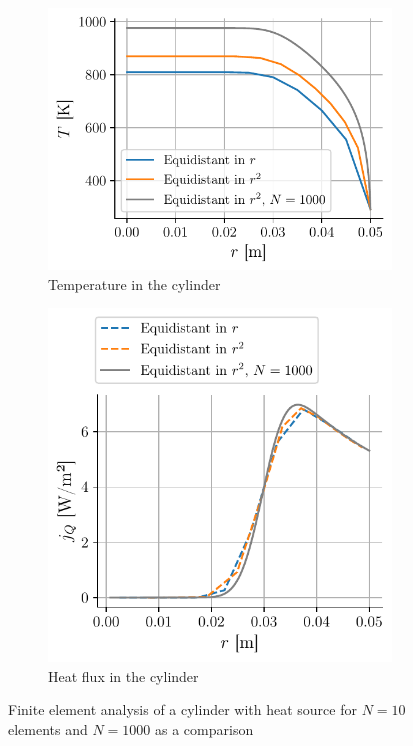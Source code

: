 \begin{figure}[h]
    \centering
    \begin{subfigure}{0.48\linewidth}
        \centering
        \includegraphics[width=\linewidth]{figures/var_T.pdf}
        \caption{Temperature in the cylinder}
        \label{fig:var_T}
    \end{subfigure}
    \begin{subfigure}{0.48\linewidth}
        \centering
        \includegraphics[width=\linewidth]{figures/var_j.pdf}
        \caption{Heat flux in the cylinder}
        \label{fig:var_j}
    \end{subfigure}
    \caption{Finite element analysis of a cylinder with heat source for $N = 10$ elements and $N=1000$ as a comparison}
    \label{fig:var_behavior}
\end{figure}

